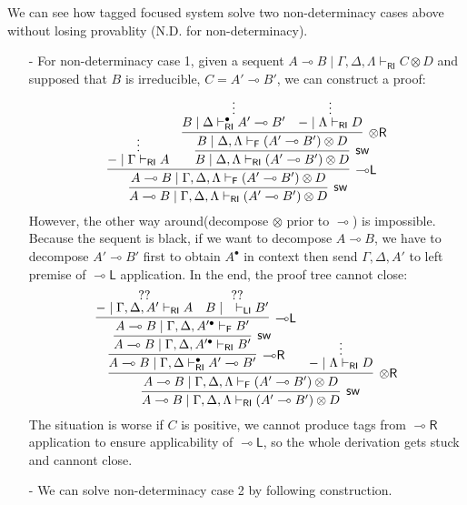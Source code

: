 \documentclass[submission,copyright,creativecommons]{eptcs}
\theoremstyle{definition}
\newcommand{\tr}{\otimes \mathsf{R}}
\newcommand{\lright}{{\multimap}\mathsf{R}}
\newcommand{\lleft}{{\multimap}\mathsf{L}}
\newcommand{\ot}{\otimes}
\newcommand{\lolli}{\multimap}
\newcommand{\RI}{\mathsf{RI}}
\newcommand{\LI}{\mathsf{LI}}
\newcommand{\F}{\mathsf{F}}
\begin{document}
We can see how tagged focused system solve two non-determinacy cases above without losing provablity (N.D. for non-determinacy).
\begin{itemize}
  \item[-] For non-determinacy case 1, given a sequent $A \lolli B \mid \Gamma , \Delta , \Lambda \vdash_{\RI} C \ot D$ and supposed that $B$ is irreducible, $C = A' \lolli B'$,
  we can construct a proof:
  \begin{displaymath}
    \infer[\mathsf{sw}]{A \lolli B \mid \Gamma , \Delta , \Lambda \vdash_{\RI} (A' \lolli B') \ot D}{
      \infer[\lleft]{A \lolli B \mid \Gamma , \Delta , \Lambda \vdash_{\F} (A' \lolli B') \ot D}{
        \deduce{- \mid \Gamma \vdash_{\RI} A}{\vdots}
        &
        \infer[\mathsf{sw}]{B \mid \Delta , \Lambda \vdash_{\RI} (A' \lolli B') \ot D}{
          \infer[\tr]{B \mid \Delta , \Lambda \vdash_{\F} (A' \lolli B') \ot D}{
            \deduce{B \mid \Delta \vdash^{\bullet}_{\RI} A' \lolli B'}{\vdots}
            &
            \deduce{- \mid \Lambda \vdash_{\RI} D}{\vdots}
          }
        }
      }
    }
  \end{displaymath}
  However, the other way around(decompose $\ot$ prior to $\lolli$) is impossible.
  Because the sequent is black, if we want to decompose $A \lolli B$, we have to decompose $A' \lolli B'$ first to obtain $A^{\bullet}$ in context then send $\Gamma , \Delta , A'$ to left premise of $\lleft$ application.
  In the end, the proof tree cannot close:
  \begin{displaymath}
    \infer[\mathsf{sw}]{A \lolli B \mid \Gamma , \Delta , \Lambda \vdash_{\RI} (A' \lolli B') \ot D}{
      \infer[\tr]{A \lolli B \mid \Gamma , \Delta , \Lambda \vdash_{\F} (A' \lolli B') \ot D}{
        \infer[\lright]{A \lolli B \mid \Gamma , \Delta \vdash^{\bullet}_{\RI} A' \lolli B'}{
          \infer[\mathsf{sw}]{A \lolli B \mid \Gamma , \Delta , A'^{\bullet} \vdash_{\RI} B'}{
            \infer[\lleft]{A \lolli B \mid \Gamma , \Delta , A'^{\bullet} \vdash_{\F} B'}{
              \deduce{- \mid \Gamma , \Delta , A' \vdash_{\RI} A}{??}
              &
              \deduce{B \mid \quad \vdash_{\LI} B'}{??}
            }
          }
        }
        &
        \deduce{- \mid \Lambda \vdash_{\RI} D}{\vdots}
      }
    }
  \end{displaymath}
  The situation is worse if $C$ is positive, we cannot produce tags from $\lright$ application to ensure applicability of $\lleft$, so the whole derivation gets stuck and cannont close.
  \item[-] We can solve non-determinacy case 2 by following construction.

\end{itemize}
\end{document}
